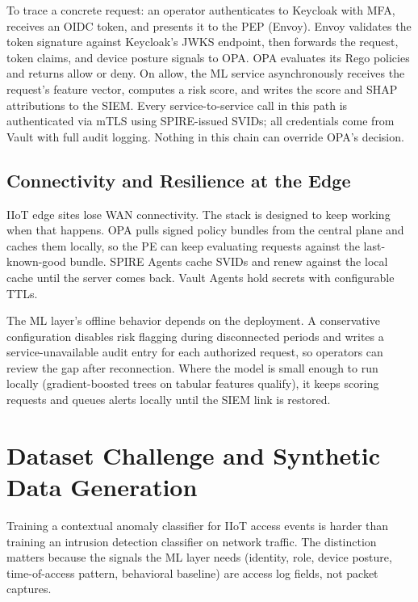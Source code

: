 \documentclass[conference]{IEEEtran}
\begin{document}
To trace a concrete request: an operator authenticates to Keycloak with MFA, receives an OIDC token, and presents it to the PEP (Envoy). Envoy validates the token signature against Keycloak's JWKS endpoint, then forwards the request, token claims, and device posture signals to OPA. OPA evaluates its Rego policies and returns allow or deny. On allow, the ML service asynchronously receives the request's feature vector, computes a risk score, and writes the score and SHAP attributions to the SIEM. Every service-to-service call in this path is authenticated via mTLS using SPIRE-issued SVIDs; all credentials come from Vault with full audit logging. Nothing in this chain can override OPA's decision.

\subsection{Connectivity and Resilience at the Edge}

IIoT edge sites lose WAN connectivity. The stack is designed to keep working when that happens. OPA pulls signed policy bundles from the central plane and caches them locally, so the PE can keep evaluating requests against the last-known-good bundle. SPIRE Agents cache SVIDs and renew against the local cache until the server comes back. Vault Agents hold secrets with configurable TTLs.

The ML layer's offline behavior depends on the deployment. A conservative configuration disables risk flagging during disconnected periods and writes a service-unavailable audit entry for each authorized request, so operators can review the gap after reconnection. Where the model is small enough to run locally (gradient-boosted trees on tabular features qualify), it keeps scoring requests and queues alerts locally until the SIEM link is restored.

\section{Dataset Challenge and Synthetic Data Generation}
\label{sec:dataset}

Training a contextual anomaly classifier for IIoT access events is harder than training an intrusion detection classifier on network traffic. The distinction matters because the signals the ML layer needs (identity, role, device posture, time-of-access pattern, behavioral baseline) are access log fields, not packet captures.
\end{document}
